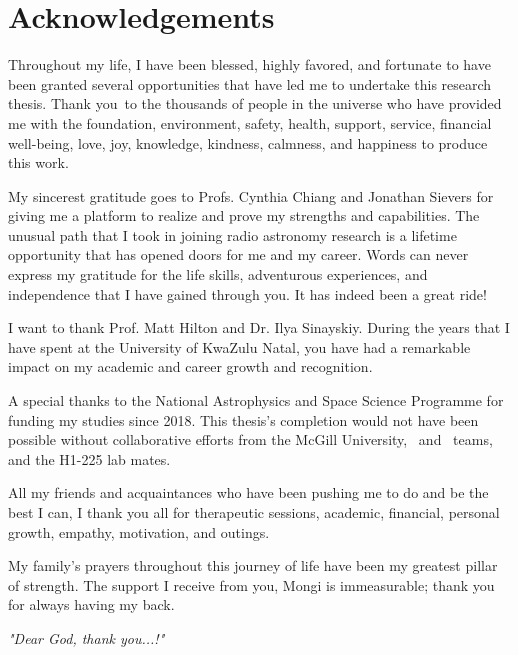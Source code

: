 \section*{Acknowledgements}

Throughout my life, I have been blessed, highly favored, and fortunate to have been granted several opportunities that have led me to undertake this research thesis. Thank you to the thousands of people in the universe who have provided me with the foundation, environment, safety, health, support, service, financial well-being, love, joy, knowledge, kindness, calmness, and happiness to produce this work.

My sincerest gratitude goes to Profs. Cynthia Chiang and Jonathan Sievers for giving me a platform to realize and prove my strengths and capabilities. The unusual path that I took in joining radio astronomy research is a lifetime opportunity that has opened doors for me and my career. Words can never express my gratitude for the life skills, adventurous experiences, and independence that I have gained through you. It has indeed been a great ride!

I want to thank Prof. Matt Hilton and Dr. Ilya Sinayskiy. During the years that I have spent at the University of KwaZulu Natal, you have had a remarkable impact on my academic and career growth and recognition. 

A special thanks to the National Astrophysics and Space Science Programme for funding my studies since 2018. This thesis's completion would not have been possible without collaborative efforts from the McGill University, \prizm\ and \albatros\ teams, and the H1-225 lab mates. 

All my friends and acquaintances who have been pushing me to do and be the best I can, I thank you all for therapeutic sessions, academic, financial, personal growth, empathy, motivation, and outings.

My family's prayers throughout this journey of life have been my greatest pillar of strength. The support I receive from you, Mongi is immeasurable; thank you for always having my back. \\[4 cm]


\begin{center}
	\emph{"Dear God, thank you...!"}
\end{center}


